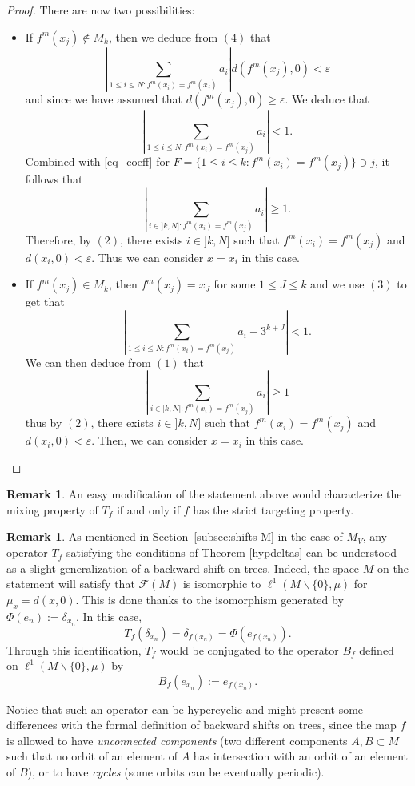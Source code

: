 \documentclass[12pt,english]{amsart}
\numberwithin{equation}{section}
\theoremstyle{plain}
\theoremstyle{definition}
\newtheorem{remark}[theorem]{Remark}
\newcommand{\free}[1]{\mathcal{F}(#1)}
\begin{document}
\begin{proof}
There are now two possibilities:
\begin{itemize}
\item If $f^m(x_j)\notin M_k$, then we deduce from $(4)$ that 
\[\left|\sum_{1\le i\le N:f^m(x_i)=f^m(x_j)}a_i\right| d(f^m(x_j),0)<\varepsilon\]
and since we have assumed that $d(f^m(x_j),0)\ge \varepsilon$. We deduce that 
\[\left|\sum_{1\le i\le N:f^m(x_i)=f^m(x_j)}a_i\right|<1.\]
Combined with \eqref{eq_coeff} for $F=\{1\le i\le k:f^m(x_i)=f^m(x_j)  \}\ni j$, it follows that  
\[\left|\sum_{i\in ]k,N]:f^m(x_i)=f^m(x_j)}a_i\right|\ge 1.\]
Therefore, by $(2)$, there exists $i\in ]k,N]$ such that $f^m(x_i)=f^m(x_j)$ and $d(x_i,0)<\varepsilon$. Thus we can consider $x=x_i$ in this case.

\item If $f^m(x_j)\in M_k$, then $f^m(x_j)=x_J$ for some $1\le J\le k$ and we use $(3)$ to get that 
\[\left|\sum_{1\leq i\leq N:f^m(x_i)=f^m(x_j)}a_i-3^{k+J}\right|<1.\]
We can then deduce from $(1)$ that
\[\left|\sum_{i\in ]k,N]:f^m(x_i)=f^m(x_j)}a_i\right|\ge 1\]
thus by $(2)$, there exists $i\in ]k,N]$ such that $f^m(x_i)=f^m(x_j)$ and $d(x_i,0)<\varepsilon$. Then, we can consider $x=x_i$ in this case.
\end{itemize}

\end{proof}

\begin{remark}
    An easy modification of the statement above would characterize the mixing property of $T_f$ if and only if $f$ has the strict targeting property.
\end{remark}

\begin{remark} As mentioned in Section~\ref{subsec:shifts-M} in the case of $M_V$, any operator $T_f$ satisfying the conditions of Theorem \ref{hypdeltas} can be understood as a slight generalization of a backward shift on trees. Indeed, the space $M$ on the statement will satisfy that $\free{M}$ is isomorphic to $\ell^1(M\backslash\{0\},\mu)$ for $\mu_x=d(x,0)$. This is done thanks to the isomorphism generated by $\Phi(e_n):= \delta_{x_n}$. In this case, 
    \[T_f(\delta_{x_n})= \delta_{f(x_n)}=\Phi(e_{f(x_n)}).\]
    Through this identification, $T_f$ would be conjugated to the operator $B_{f}$ defined on $\ell^1(M\backslash\{0\},\mu)$ by 
    \[B_{f}(e_{x_n}):= e_{f(x_n)}.\]
    
    Notice that such an operator can be hypercyclic and might present some differences with the formal definition of backward shifts on trees, since the map $f$ is allowed to have \textit{unconnected components} (two different components $A,B\subset M$ such that no orbit of an element of $A$ has intersection with an orbit of an element of $B$), or to have \textit{cycles} (some orbits can be eventually periodic).
\end{remark}
\end{document}
